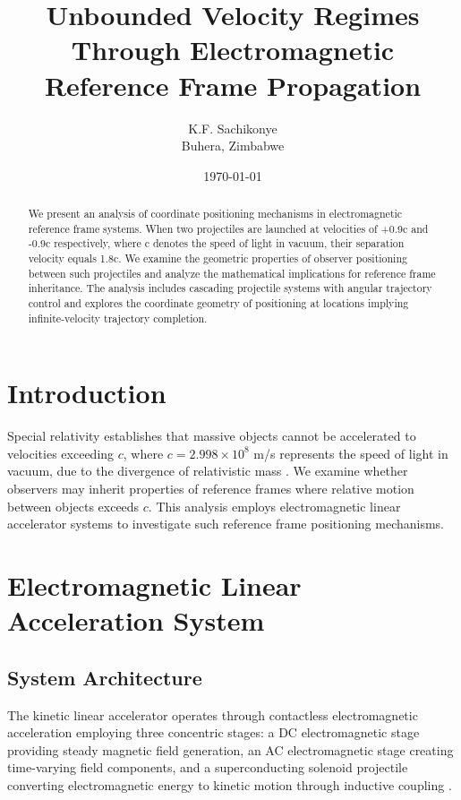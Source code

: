 \documentclass[12pt,a4paper]{article}
\title{Unbounded Velocity Regimes Through Electromagnetic Reference Frame Propagation}
\author{
K.F. Sachikonye\\
Buhera, Zimbabwe
}
\date{\today}
\begin{document}
\maketitle

\begin{abstract}
We present an analysis of coordinate positioning mechanisms in electromagnetic reference frame systems. When two projectiles are launched at velocities of +0.9c and -0.9c respectively, where c denotes the speed of light in vacuum, their separation velocity equals 1.8c. We examine the geometric properties of observer positioning between such projectiles and analyze the mathematical implications for reference frame inheritance. The analysis includes cascading projectile systems with angular trajectory control and explores the coordinate geometry of positioning at locations implying infinite-velocity trajectory completion.
\end{abstract}

\section{Introduction}

Special relativity establishes that massive objects cannot be accelerated to velocities exceeding $c$, where $c = 2.998 \times 10^8$ m/s represents the speed of light in vacuum, due to the divergence of relativistic mass \cite{einstein1905,rindler2001}. We examine whether observers may inherit properties of reference frames where relative motion between objects exceeds $c$. This analysis employs electromagnetic linear accelerator systems \cite{marshall1982,humphries1986} to investigate such reference frame positioning mechanisms.

\section{Electromagnetic Linear Acceleration System}

\subsection{System Architecture}

The kinetic linear accelerator operates through contactless electromagnetic acceleration employing three concentric stages: a DC electromagnetic stage providing steady magnetic field generation, an AC electromagnetic stage creating time-varying field components, and a superconducting solenoid projectile converting electromagnetic energy to kinetic motion through inductive coupling \cite{paulson1986,fair1986}.
\end{document}
